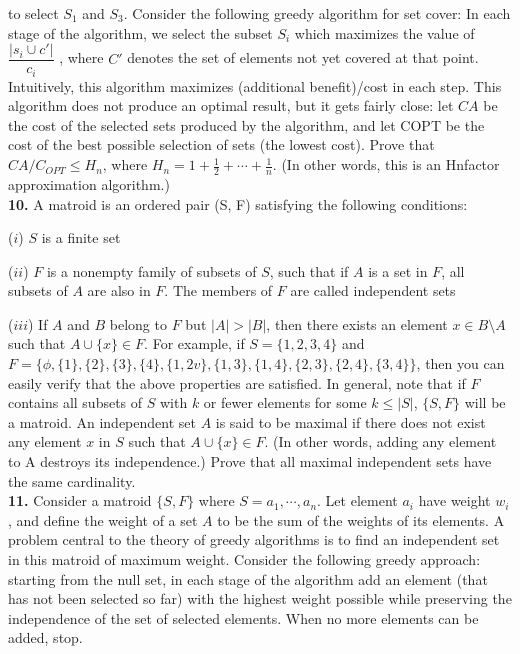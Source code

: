 \documentclass[a4paper,11pt]{book}
\begin{document}
to select $S_1$ and $S_3$.
Consider the following greedy algorithm for set cover: In each
stage of the algorithm, we select the subset $S_i$ which
maximizes the value of $\dfrac{|s_{i} \cup c'|}{c_i}$ , where $C'$ denotes the set of
elements not yet covered at that point. Intuitively, this
algorithm maximizes (additional benefit)/cost in each step.
This algorithm does not produce an optimal result, but it gets
fairly close: let $CA$ be the cost of the selected sets produced by
the algorithm, and let COPT be the cost of the best possible
selection of sets (the lowest cost). Prove that $CA/C_{OPT} \le H_n$,
where $H_n = 1 + \frac{1}{2}+ \cdots+ \frac{1}{n}$. (In other words, this is an Hnfactor approximation algorithm.)\\
\textbf{ 10.} A matroid is an ordered pair (S, F) satisfying the following
conditions:
\par\noindent($i$) $S$ is a finite set
\par\noindent($ii$) $F$ is a nonempty family of subsets of $S$, such that if $A$ is a
set in $F$, all subsets of $A$ are also in $F$. The members of $F$
are called independent sets
\par\noindent($iii$) If $A$ and $B$ belong to $F$ but $ |A| > |B|$, then there exists an
element $x \in B\setminus A$ such that $A \cup \{x\} \in F$. For example, if $S = \{1, 2, 3, 4\}$ and $F =\{  \phi , \{1\}, \{2\}, \{3\}, \{4\}, \{1,2v\}, \{1, 3\}, \{1, 4\}, \{2, 3\}, \{2, 4\}, \{3,4\}\}$, then you can easily verify
that the above properties are satisfied. In general, note that if $F$ contains all subsets of $S$ with $k$ or fewer elements for some $k \le |S|$, $\{S, F\}$ will be a matroid.
An independent set $A$ is said to be maximal if there does not
exist any element $x$ in $S$ such that $A \cup \{x\} \in F$. (In other words,
adding any element to A destroys its independence.) Prove
that all maximal independent sets have the same
cardinality.\\
\textbf{ 11.} Consider a matroid $\{S, F\}$ where $S = {a_1, \cdots, a_n}$. Let element $a_i$
have weight $w_i$, and define the weight of a set $A$ to be the sum
of the weights of its elements. A problem central to the theory
of greedy algorithms is to find an independent set in this
matroid of maximum weight. Consider the following greedy
approach: starting from the null set, in each stage of the
algorithm add an element (that has not been selected so far)
with the highest weight possible while preserving the
independence of the set of selected elements. When no more
elements can be added, stop.
\end{document}
